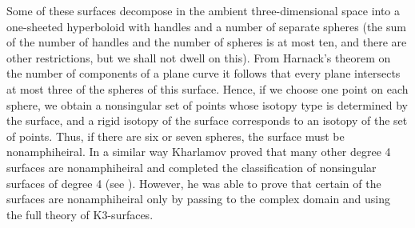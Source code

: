 \documentclass{article}
\begin{document}
Some of these surfaces decompose in the ambient three-dimensional space into a
one-sheeted hyperboloid with handles and a number of separate spheres (the sum
of the number of handles and the number of spheres is at most ten, and there
are other restrictions, but we shall not dwell on this). From Harnack's theorem
on the number of components of a plane curve it follows that every plane
intersects at most three of the spheres of this surface. Hence, if we choose
one point on each sphere, we obtain a nonsingular set of points whose isotopy
type is determined by the surface, and a rigid isotopy of the surface
corresponds to an isotopy of the set of points. Thus, if there are six or seven
spheres, the surface must be nonamphiheiral. In a similar way Kharlamov proved that
many other degree 4 surfaces are nonamphiheiral and completed the classification of
nonsingular surfaces of degree 4 (see \cite{13}). However, he was able 
to prove
that certain of the surfaces are nonamphiheiral only by passing to the complex
domain and using the full theory of K3-surfaces.
\end{document}
